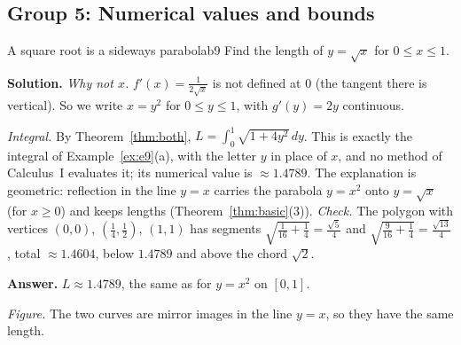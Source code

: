 \documentclass[11pt]{article}
\begin{document}
\subsection*{Group 5: Numerical values and bounds}

\begin{exmp}{A square root is a sideways parabola}{b9}
Find the length of $y=\sqrt x$ for $0\le x\le1$.

\textbf{Solution.} \emph{Why not $x$.} $f'(x)=\frac1{2\sqrt x}$ is not defined at $0$ (the tangent there is vertical). So we write $x=y^2$ for $0\le y\le1$, with $g'(y)=2y$ continuous.

\emph{Integral.} By Theorem~\ref{thm:both}, $L=\int_0^1\sqrt{1+4y^2}\,dy$. This is exactly the integral of Example~\ref{ex:e9}(a), with the letter $y$ in place of $x$, and no method of Calculus~I evaluates it; its numerical value is $\approx1.4789$. The explanation is geometric: reflection in the line $y=x$ carries the parabola $y=x^2$ onto $y=\sqrt x$ (for $x\ge0$) and keeps lengths (Theorem~\ref{thm:basic}(3)).
\emph{Check.} The polygon with vertices $(0,0)$, $(\frac14,\frac12)$, $(1,1)$ has segments $\sqrt{\frac1{16}+\frac14}=\frac{\sqrt5}4$ and $\sqrt{\frac9{16}+\frac14}=\frac{\sqrt{13}}4$, total $\approx1.4604$, below $1.4789$ and above the chord $\sqrt2$.

\textbf{Answer.} $L\approx1.4789$, the same as for $y=x^2$ on $[0,1]$.
\begin{center}
\par\small\emph{Figure.} The two curves are mirror images in the line $y=x$, so they have the same length.
\end{center}
\end{exmp}
\end{document}

